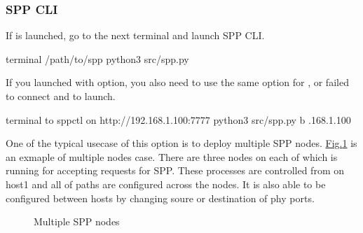 \documentclass[a4paper,11pt,openany,oneside,english]{sphinxmanual}
\begin{document}
\subsubsection{SPP CLI}
\label{\detokenize{gsg/howto_use:spp-cli}}\label{\detokenize{gsg/howto_use:spp-setup-howto-use-spp-cli}}
If  is launched, go to the next terminal and launch SPP CLI.

\begin{sphinxVerbatim}[commandchars=\\\{\},formatcom=\footnotesize]
 terminal 
  /path/to/spp
 python3 src/spp.py

\end{sphinxVerbatim}

If you launched  with  option, you also need to use the same
option for , or failed to connect and to launch.

\begin{sphinxVerbatim}[commandchars=\\\{\},formatcom=\footnotesize]
 terminal 
  to spp\PYGZhy{}ctl on http://192.168.1.100:7777
 python3 src/spp.py \PYGZhy{}b .168.1.100

\end{sphinxVerbatim}

One of the typical usecase of this option is to deploy multiple SPP nodes.
\hyperref[\detokenize{gsg/howto_use:figure-spp-howto-multi-spp}]{Fig.\@ \ref{\detokenize{gsg/howto_use:figure-spp-howto-multi-spp}}} is an exmaple of multiple nodes case.
There are three nodes on each of which  is running for accepting
requests for SPP. These  processes are controlled from
 on host1 and all of paths are configured across the nodes.
It is also able to be configured between hosts by changing
soure or destination of phy ports.

\begin{figure}[htbp]
\centering
\capstart

\noindent{}
\caption{Multiple SPP nodes}\label{\detokenize{gsg/howto_use:id1}}\label{\detokenize{gsg/howto_use:figure-spp-howto-multi-spp}}\end{figure}
\end{document}
